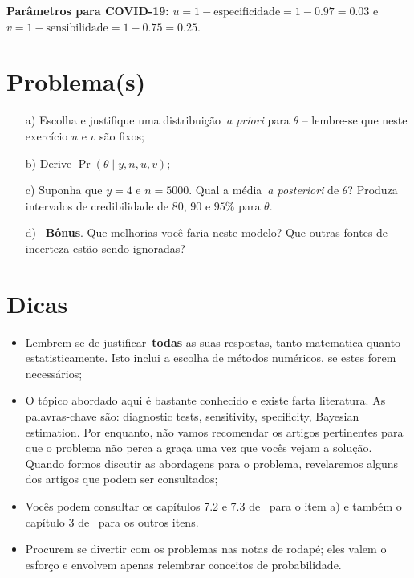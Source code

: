 \documentclass[a4paper, notitlepage, 10pt]{article}
\begin{document}
\textbf{Parâmetros para COVID-19:} $u = 1-\text{especificidade} = 1-0.97 = 0.03$ e $v = 1-\text{sensibilidade} = 1-0.75 = 0.25$. 

\section*{Problema(s)}
\begin{itemize}
 \item[a)] Escolha e justifique uma distribuição~\textit{a priori} para $\theta$ -- lembre-se que neste exercício $u$ e $v$ são fixos;
 \item[b)] Derive $\operatorname{Pr}(\theta \mid y, n, u, v)$;
 \item[c)] Suponha que $y = 4$ e $n = 5000$.
 Qual a média~\textit{a posteriori} de $\theta$?
 Produza intervalos de credibilidade de $80$, $90$ e $95$\% para $\theta$. 
 \item[d)]~\textbf{Bônus}. Que melhorias você faria neste modelo? Que outras fontes de incerteza estão sendo ignoradas?
\end{itemize}



\section*{Dicas}
\begin{itemize}
 \item Lembrem-se de justificar~\textbf{todas} as suas respostas, tanto matematica quanto estatisticamente. 
 Isto inclui a escolha de métodos numéricos, se estes forem necessários;
 \item O tópico abordado aqui é bastante conhecido e existe farta literatura.
 As palavras-chave são: diagnostic tests, sensitivity, specificity, Bayesian estimation.
 Por enquanto, não vamos recomendar os artigos pertinentes para que o problema não perca a graça uma vez que vocês vejam a solução. 
 Quando formos discutir as abordagens para o problema, revelaremos alguns dos artigos que podem ser consultados;
 \item Vocês podem consultar os capítulos 7.2 e 7.3 de~\cite{DeGroot2012} para o item a) e também o capítulo 3 de~\cite{McElreath2020} para os outros itens.
 \item Procurem se divertir com os problemas nas notas de rodapé; eles valem o esforço e envolvem apenas relembrar conceitos de probabilidade.
\end{itemize}




\end{document}

